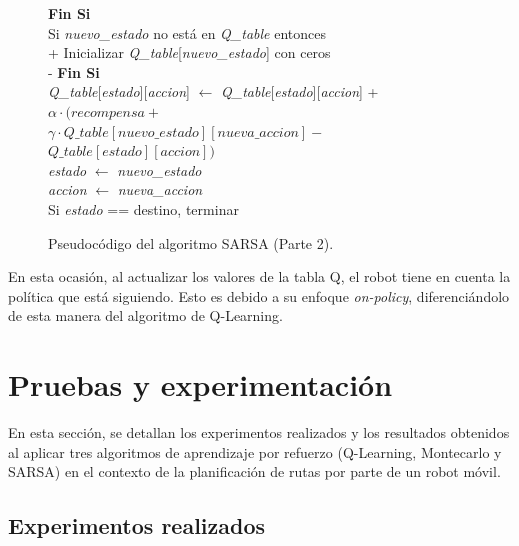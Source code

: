 \documentclass[conference,a4paper]{IEEEtran}
\begin{document}
\begin{figure}
  \begin{minipage}{\linewidth}
  \begin{pseudo}
  \textbf{Fin Si} \\
  Si \textit{nuevo\_estado} \textnormal{no está en} \textit{Q\_table} entonces \\+
    Inicializar \textit{Q\_table}[\textit{nuevo\_estado}] con ceros \\-
  \textbf{Fin Si} \\
  \textit{Q\_table}[\textit{estado}][\textit{accion}] $\leftarrow$ \textit{Q\_table}[\textit{estado}][\textit{accion}] + \\
  \> $\alpha \cdot (\textit{recompensa} + $ \\
  \> $\gamma \cdot \textit{Q\_table}[\textit{nuevo\_estado}][\textit{nueva\_accion}] -$ \\
  \> $\textit{Q\_table}[\textit{estado}][\textit{accion}])$ \\
  \> \textit{estado} $\leftarrow$ \textit{nuevo\_estado} \\
  \> \textit{accion} $\leftarrow$ \textit{nueva\_accion} \\
  \> Si \textit{estado} == destino, terminar \\
  \end{pseudo}
  \end{minipage}
  \caption{Pseudocódigo del algoritmo SARSA (Parte 2).}
  \label{fig:sarsa2}
\end{figure}


En esta ocasión, al actualizar los valores de la tabla Q, el robot tiene en cuenta la política que está siguiendo. Esto es debido a su enfoque \textit{on-policy}, diferenciándolo de esta manera del algoritmo de Q-Learning.\newline

\section{Pruebas y experimentación}
En esta sección, se detallan los experimentos realizados y los resultados obtenidos al aplicar tres algoritmos de aprendizaje por refuerzo (Q-Learning, Montecarlo y SARSA) 
en el contexto de la planificación de rutas por parte de un robot móvil.

\subsection{Experimentos realizados}
\end{document}
